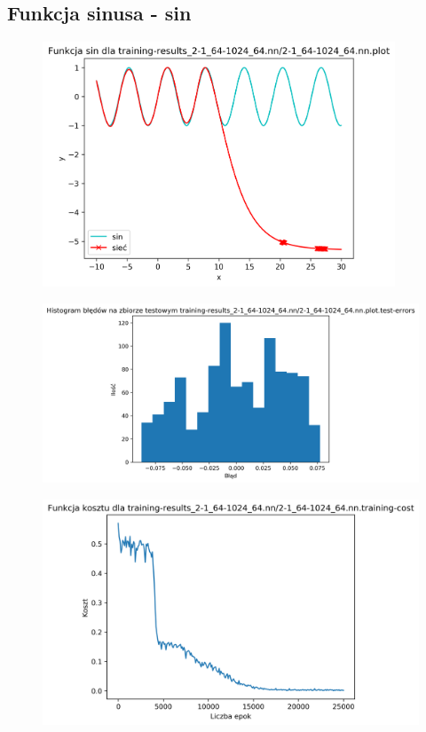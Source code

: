 \documentclass{classrep}
\begin{document}
{        \subsection{Funkcja sinusa - sin}
        {
            \begin{figure}[!htbp]
                \centering
                \includegraphics[width=105mm]{wykresy/2-1_64-1024_64_nn_plot.png}
            \end{figure}
            \begin{figure}[!htbp]
                \centering
                \includegraphics[width=140mm]{wykresy/2-1_64-1024_64_nn_plot_test-errors.png}
            \end{figure}
            \begin{figure}[!htbp]
                \centering
                \includegraphics[width=120mm]{wykresy/2-1_64-1024_64_nn_training-cost.png}

\end{figure}}}
\end{document}
